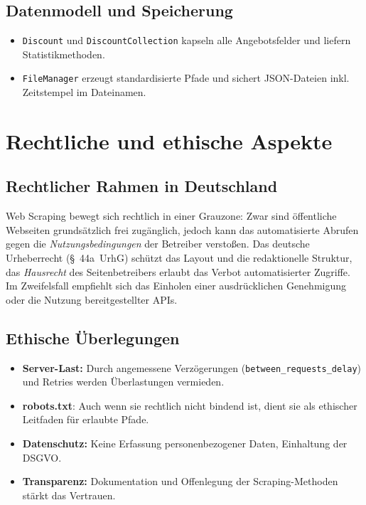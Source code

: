 \documentclass[12pt, a4paper]{report} %
\begin{document}
\subsection{Datenmodell und Speicherung}
\begin{itemize}
  \item \texttt{Discount} und \texttt{DiscountCollection} kapseln alle Angebotsfelder und liefern Statistikmethoden.  
  \item \texttt{FileManager} erzeugt standardisierte Pfade und sichert JSON-Dateien inkl. Zeitstempel im Dateinamen.  
\end{itemize}

\section{Rechtliche und ethische Aspekte}
\subsection{Rechtlicher Rahmen in Deutschland}
Web Scraping bewegt sich rechtlich in einer Grauzone: Zwar sind öffentliche Webseiten grundsätzlich frei zugänglich, jedoch kann das automatisierte Abrufen gegen die \emph{Nutzungsbedingungen} der Betreiber verstoßen. Das deutsche Urheberrecht (§ 44a UrhG) schützt das Layout und die redaktionelle Struktur, das \emph{Hausrecht} des Seitenbetreibers erlaubt das Verbot automatisierter Zugriffe. Im Zweifelsfall empfiehlt sich das Einholen einer ausdrücklichen Genehmigung oder die Nutzung bereitgestellter APIs.

\subsection{Ethische Überlegungen}
\begin{itemize}
  \item \textbf{Server-Last:} Durch angemessene Verzögerungen (\texttt{between\_requests\_delay}) und Retries werden Überlastungen vermieden.  
  \item \textbf{robots.txt}: Auch wenn sie rechtlich nicht bindend ist, dient sie als ethischer Leitfaden für erlaubte Pfade.  
  \item \textbf{Datenschutz:} Keine Erfassung personenbezogener Daten, Einhaltung der DSGVO.  
  \item \textbf{Transparenz:} Dokumentation und Offenlegung der Scraping-Methoden stärkt das Vertrauen.  
\end{itemize}
\end{document}
